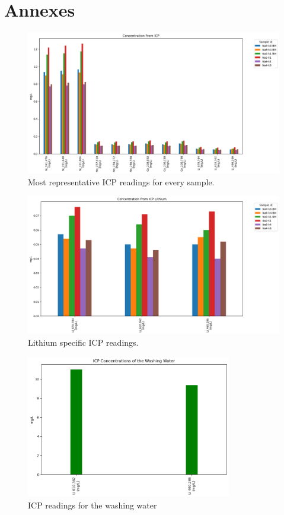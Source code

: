 \documentclass{article}
\begin{document}
\section{Annexes} 
\begin{figure}[H]
  \centering
  \includegraphics[width=\textwidth]{output.png}
  \caption{Most representative ICP readings for every sample.}
  \label{fig:example_image}
\end{figure}
\begin{figure}[H]
  \centering
  \includegraphics[width=\textwidth]{output3.png}
  \caption{Lithium specific ICP readings.}
  \label{fig:example_image}
\end{figure}
\begin{figure}[H]
  \centering
  \includegraphics[width=0.8\textwidth]{output2.png}
  \caption{ICP readings for the washing water }
  \label{fig:example_image}
\end{figure}
\newpage
\listoffigures

\listoftables



\end{document}
